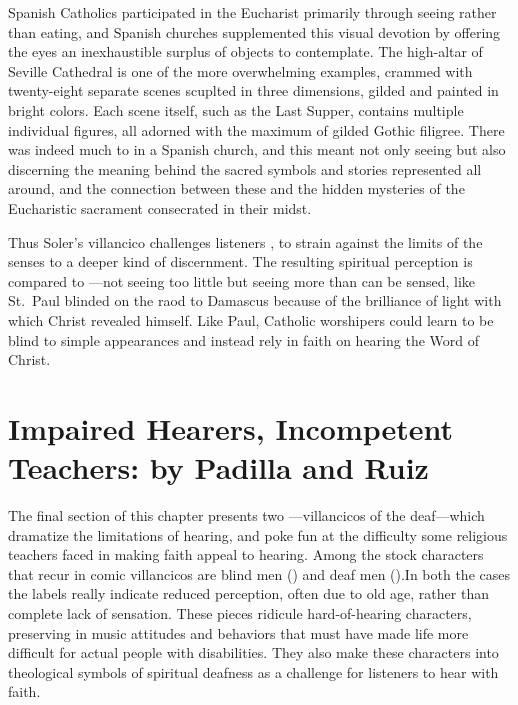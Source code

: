Spanish Catholics participated in the Eucharist primarily through seeing rather than eating,\citXXX{} and Spanish churches supplemented this visual devotion by offering the eyes an inexhaustible surplus of objects to contemplate.
The high-altar  of Seville Cathedral is one of the more overwhelming examples, crammed with twenty-eight separate scenes scuplted in three dimensions, gilded and painted in bright colors.\citXXX{}
Each scene itself, such as the Last Supper, contains multiple individual figures, all adorned with the maximum of gilded Gothic filigree.
There was indeed much to  in a Spanish church, and this meant not only seeing but also discerning the meaning behind the sacred symbols and stories represented all around, and the connection between these and the hidden mysteries of the Eucharistic sacrament consecrated in their midst.

Thus Soler's villancico challenges listeners , to strain against the limits of the senses to a deeper kind of discernment.
The resulting spiritual perception is compared to ---not seeing too little but seeing more than can be sensed, like St.\ Paul blinded on the raod to Damascus because of the brilliance of light with which Christ revealed himself.
Like Paul, Catholic worshipers could learn to be blind to simple appearances and instead rely in faith on hearing the Word of Christ.

\section[Impaired Hearers, Incompetent Teachers]{Impaired Hearers, Incompetent Teachers:  by Padilla and Ruiz}

The final section of this chapter presents two ---villancicos of the deaf---which dramatize the limitations of hearing, and poke fun at the difficulty some religious teachers faced in making faith appeal to hearing.
Among the stock characters that recur in comic villancicos are blind men () and deaf men ().
In both the cases the labels really indicate reduced perception, often due to old age, rather than complete lack of sensation.
These pieces ridicule hard-of-hearing characters, preserving in music attitudes and behaviors that must have made life more difficult for actual people with disabilities.
They also make these characters into theological symbols of spiritual deafness as a challenge for  listeners to hear with faith.

